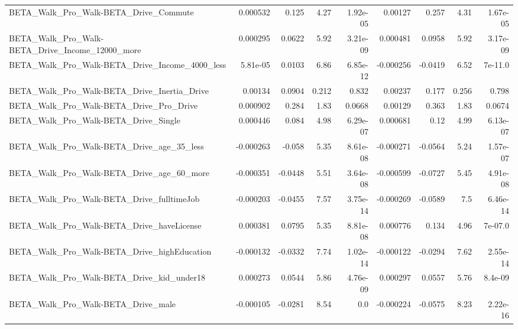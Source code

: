 \begin{tabular}{lrrrrrrrr}
BETA\_Walk\_Pro\_Walk-BETA\_Drive\_Commute              &    0.000532 &        0.125 &     4.27 & 1.92e-05 &    0.00127 &       0.257 &         4.31 &      1.67e-05 \\
BETA\_Walk\_Pro\_Walk-BETA\_Drive\_Income\_12000\_more    &    0.000295 &       0.0622 &     5.92 & 3.21e-09 &   0.000481 &      0.0958 &         5.92 &      3.17e-09 \\
BETA\_Walk\_Pro\_Walk-BETA\_Drive\_Income\_4000\_less     &    5.81e-05 &       0.0103 &     6.86 & 6.85e-12 &  -0.000256 &     -0.0419 &         6.52 &       7e-11.0 \\
BETA\_Walk\_Pro\_Walk-BETA\_Drive\_Inertia\_Drive        &     0.00134 &       0.0904 &    0.212 &    0.832 &    0.00237 &       0.177 &        0.256 &         0.798 \\
BETA\_Walk\_Pro\_Walk-BETA\_Drive\_Pro\_Drive            &    0.000902 &        0.284 &     1.83 &   0.0668 &    0.00129 &       0.363 &         1.83 &        0.0674 \\
BETA\_Walk\_Pro\_Walk-BETA\_Drive\_Single               &    0.000446 &        0.084 &     4.98 & 6.29e-07 &   0.000681 &        0.12 &         4.99 &      6.13e-07 \\
BETA\_Walk\_Pro\_Walk-BETA\_Drive\_age\_35\_less          &   -0.000263 &       -0.058 &     5.35 & 8.61e-08 &  -0.000271 &     -0.0564 &         5.24 &      1.57e-07 \\
BETA\_Walk\_Pro\_Walk-BETA\_Drive\_age\_60\_more          &   -0.000351 &      -0.0448 &     5.51 & 3.64e-08 &  -0.000599 &     -0.0727 &         5.45 &      4.91e-08 \\
BETA\_Walk\_Pro\_Walk-BETA\_Drive\_fulltimeJob          &   -0.000203 &      -0.0455 &     7.57 & 3.75e-14 &  -0.000269 &     -0.0589 &          7.5 &      6.46e-14 \\
BETA\_Walk\_Pro\_Walk-BETA\_Drive\_haveLicense          &    0.000381 &       0.0795 &     5.35 & 8.81e-08 &   0.000776 &       0.134 &         4.96 &       7e-07.0 \\
BETA\_Walk\_Pro\_Walk-BETA\_Drive\_highEducation        &   -0.000132 &      -0.0332 &     7.74 & 1.02e-14 &  -0.000122 &     -0.0294 &         7.62 &      2.55e-14 \\
BETA\_Walk\_Pro\_Walk-BETA\_Drive\_kid\_under18          &    0.000273 &       0.0544 &     5.86 & 4.76e-09 &   0.000297 &      0.0557 &         5.76 &       8.4e-09 \\
BETA\_Walk\_Pro\_Walk-BETA\_Drive\_male                 &   -0.000105 &      -0.0281 &     8.54 &      0.0 &  -0.000224 &     -0.0575 &         8.23 &      2.22e-16 \\

\end{tabular}
